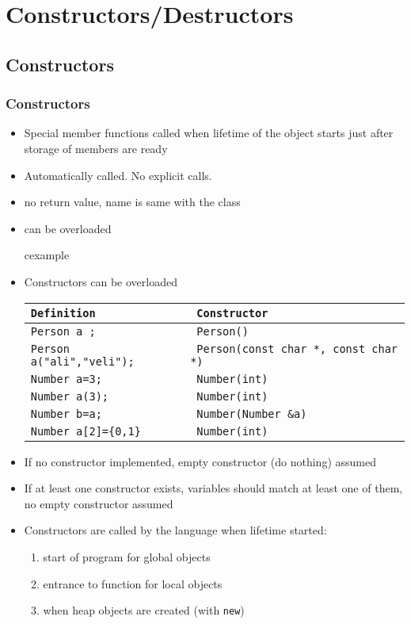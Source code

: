 \section{Constructors/Destructors}
\subsection{Constructors}
\begin{frame}
\frametitle{Constructors}
\begin{itemize}
\item Special member functions called when lifetime of the object starts
	\alert{just after storage of members are ready}
\item Automatically called. No explicit calls.
\item no return value, name is same with the class
\item can be overloaded
\begin{beamercolorbox}{cexample}
\codePersoncons
\end{beamercolorbox}
\end{itemize}
\end{frame}

\begin{frame}
\begin{itemize}
\item Constructors can be overloaded\\ {\scriptsize
	\begin{tabular}{>{\tt}l>{\tt}l}
	\bf Definition & \bf Constructor \\ \hline
	Person a ; & Person() \\
	Person a("ali","veli"); & Person(const char *, const char *) \\
	Number a=3; & Number(int) \\
	Number a(3); & Number(int) \\
	Number b=a; & Number(Number \&a) \\
	Number a[2]=\{0,1\} & Number(int) \\
	\end{tabular}}
\item If no constructor implemented, empty constructor (do nothing) assumed
\item If at least one constructor exists, variables should match at least one of them,
	no empty constructor assumed
\item Constructors are called by the language when lifetime started:\\
\begin{enumerate}
\item	start of program for global objects
\item	entrance to function for local objects
\item   when heap objects are created (with \lstinline!new!)
\end{enumerate}

\end{itemize}
\end{frame}

